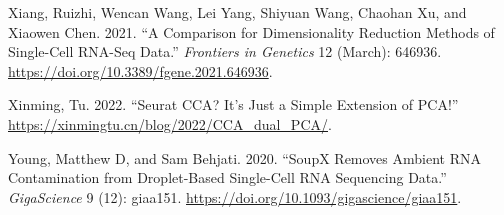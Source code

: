 \documentclass[
  letterpaper,
  DIV=11,
  numbers=noendperiod]{scrartcl}
\newlength{\cslhangindent}
\newenvironment{CSLReferences}[2] %
 {\begin{list}{}{%
  \setlength{\itemindent}{0pt}
  \setlength{\leftmargin}{0pt}
  \setlength{\parsep}{0pt}
  \ifodd #1
   \setlength{\leftmargin}{\cslhangindent}
   \setlength{\itemindent}{-1\cslhangindent}
  \fi
  \setlength{\itemsep}{#2\baselineskip}}}
 {\end{list}}
\begin{document}
\begin{CSLReferences}{1}{0}
Xiang, Ruizhi, Wencan Wang, Lei Yang, Shiyuan Wang, Chaohan Xu, and
Xiaowen Chen. 2021. {``A {Comparison} for {Dimensionality} {Reduction}
{Methods} of {Single}-{Cell} {RNA}-Seq {Data}.''} \emph{Frontiers in
Genetics} 12 (March): 646936.
\url{https://doi.org/10.3389/fgene.2021.646936}.

Xinming, Tu. 2022. {``Seurat {CCA}? {It}'s Just a Simple Extension of
{PCA}!''} \url{https://xinmingtu.cn/blog/2022/CCA_dual_PCA/}.

Young, Matthew D, and Sam Behjati. 2020. {``{SoupX} Removes Ambient
{RNA} Contamination from Droplet-Based Single-Cell {RNA} Sequencing
Data.''} \emph{GigaScience} 9 (12): giaa151.
\url{https://doi.org/10.1093/gigascience/giaa151}.

\end{CSLReferences}
\end{document}
